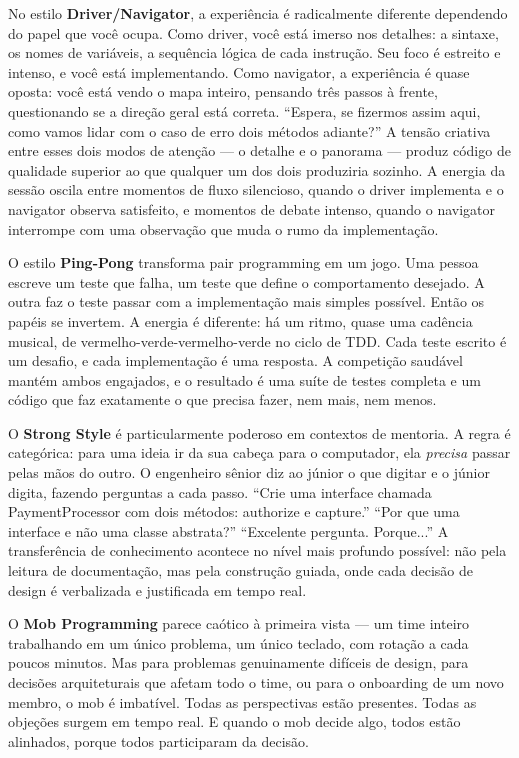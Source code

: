 No estilo \textbf{Driver/Navigator}, a experiência é radicalmente diferente
dependendo do papel que você ocupa. Como driver, você está imerso nos detalhes:
a sintaxe, os nomes de variáveis, a sequência lógica de cada instrução. Seu
foco é estreito e intenso, e você está implementando. Como navigator, a
experiência é quase oposta: você está vendo o mapa inteiro, pensando três
passos à frente, questionando se a direção geral está correta. ``Espera, se
fizermos assim aqui, como vamos lidar com o caso de erro dois métodos
adiante?'' A tensão criativa entre esses dois modos de atenção --- o detalhe
e o panorama --- produz código de qualidade superior ao que qualquer um dos
dois produziria sozinho. A energia da sessão oscila entre momentos de fluxo
silencioso, quando o driver implementa e o navigator observa satisfeito, e
momentos de debate intenso, quando o navigator interrompe com uma observação
que muda o rumo da implementação.

O estilo \textbf{Ping-Pong} transforma pair programming em um jogo. Uma pessoa
escreve um teste que falha, um teste que define o comportamento desejado.
A outra faz o teste passar com a implementação mais simples possível. Então
os papéis se invertem. A energia é diferente: há um ritmo, quase uma cadência
musical, de vermelho-verde-vermelho-verde no ciclo de TDD. Cada teste escrito
é um desafio, e cada implementação é uma resposta. A competição saudável
mantém ambos engajados, e o resultado é uma suíte de testes completa e um
código que faz exatamente o que precisa fazer, nem mais, nem menos.

O \textbf{Strong Style} é particularmente poderoso em contextos de mentoria.
A regra é categórica: para uma ideia ir da sua cabeça para o computador, ela
\textit{precisa} passar pelas mãos do outro. O engenheiro sênior diz ao
júnior o que digitar e o júnior digita, fazendo perguntas a cada passo.
``Crie uma interface chamada PaymentProcessor com dois métodos: authorize e
capture.'' ``Por que uma interface e não uma classe abstrata?'' ``Excelente
pergunta. Porque...'' A transferência de conhecimento acontece no nível mais
profundo possível: não pela leitura de documentação, mas pela construção
guiada, onde cada decisão de design é verbalizada e justificada em tempo real.

O \textbf{Mob Programming} parece caótico à primeira vista --- um time inteiro
trabalhando em um único problema, um único teclado, com rotação a cada poucos
minutos. Mas para problemas genuinamente difíceis de design, para decisões
arquiteturais que afetam todo o time, ou para o onboarding de um novo membro,
o mob é imbatível. Todas as perspectivas estão presentes. Todas as objeções
surgem em tempo real. E quando o mob decide algo, todos estão alinhados,
porque todos participaram da decisão.

